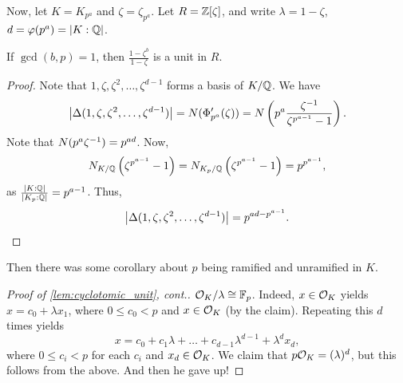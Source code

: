 Now, let $K = K_{p^a}$ and $\zeta = \zeta_{p^a}$. Let $R = \mathbb Z[\zeta]$, and write $\lambda = 1 - \zeta$, $d = \varphi(p^a) = \left\lvert K : \mathbb Q \right\rvert$.

\begin{lemma} \label{lem:cyclotomic_unit}
    If $\gcd(b, p) = 1$, then $\frac{1 - \zeta^b}{1 - \zeta}$ is a unit in $R$.
\end{lemma}
\begin{proof} \renewcommand{\qedsymbol}{\ensuremath{\triangle}}
    Note that $1, \zeta, \zeta^2, \dots, \zeta^{d-1}$ forms a basis of $K/\mathbb Q$. We have
    \[ \left\lvert \Delta(1, \zeta, \zeta^2, \dots, \zeta^{d-1}) \right\rvert = N(\Phi_{p^a}'(\zeta)) = N\left(p^a \frac{\zeta^{-1}}{\zeta^{p^{a - 1}} - 1}\right). \]
    Note that $N(p^a \zeta^{-1}) = p^{a d}$. Now,
    \[ N_{K/\mathbb Q} \left(\zeta^{p^{a - 1}} - 1\right) = N_{K_p / \mathbb Q} \left(\zeta^{p^{a-1}} - 1\right) = p^{p^{a-1}}, \]
    as $\frac{\left\lvert K:\mathbb Q \right\rvert}{\left\lvert K_p : \mathbb Q \right\rvert} = p^{a - 1}$. Thus,
    \[ \left\lvert \Delta(1, \zeta, \zeta^2, \dots, \zeta^{d-1}) \right\rvert = p^{ad - p^{a - 1}}. \qedhere \]
\end{proof}

{\color{crimson} Then there was some corollary about $p$ being ramified and unramified in $K$.}

\begin{proof}[Proof of \ref{lem:cyclotomic_unit}, cont.]
    $\mathcal O_K/\lambda \cong \mathbb F_p$. Indeed, $x \in \mathcal O_K$ yields $x = c_0 + \lambda x_1$, where $0 \leq c_0 < p$ and $x \in \mathcal O_K$ (by the claim). Repeating this $d$ times yields
    \[ x = c_0 + c_1 \lambda + \dots + c_{d-1} \lambda^{d-1} + \lambda^d x_d, \]
    where $0 \leq c_i < p$ for each $c_i$ and $x_d \in \mathcal O_K$. We claim that $p \mathcal O_K = (\lambda)^d$, but this follows from the above. {\color{amethyst} And then he gave up!}
\end{proof}